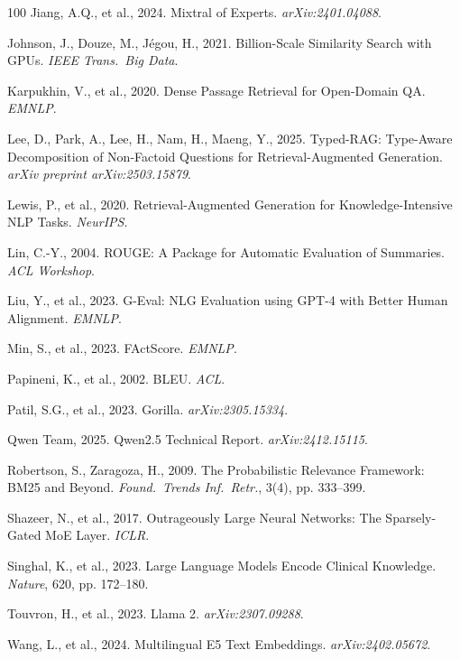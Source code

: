 \documentclass[a4paper,fleql]{cas-sc}
\begin{document}
\begin{thebibliography}{100}
Jiang, A.Q., et al., 2024. Mixtral of Experts. \textit{arXiv:2401.04088}.

Johnson, J., Douze, M., J\'{e}gou, H., 2021. Billion-Scale Similarity Search with GPUs. \textit{IEEE Trans.\ Big Data}.

Karpukhin, V., et al., 2020. Dense Passage Retrieval for Open-Domain QA. \textit{EMNLP}.

Lee, D., Park, A., Lee, H., Nam, H., Maeng, Y., 2025. Typed-RAG: Type-Aware
Decomposition of Non-Factoid Questions for Retrieval-Augmented Generation.
\textit{arXiv preprint arXiv:2503.15879}.

Lewis, P., et al., 2020. Retrieval-Augmented Generation for Knowledge-Intensive NLP Tasks. \textit{NeurIPS}.

Lin, C.-Y., 2004. ROUGE: A Package for Automatic Evaluation of Summaries. \textit{ACL Workshop}.

Liu, Y., et al., 2023. G-Eval: NLG Evaluation using GPT-4 with Better Human Alignment. \textit{EMNLP}.

Min, S., et al., 2023. FActScore. \textit{EMNLP}.

Papineni, K., et al., 2002. BLEU. \textit{ACL}.

Patil, S.G., et al., 2023. Gorilla. \textit{arXiv:2305.15334}.

Qwen Team, 2025. Qwen2.5 Technical Report. \textit{arXiv:2412.15115}.

Robertson, S., Zaragoza, H., 2009. The Probabilistic Relevance Framework: BM25 and Beyond. \textit{Found.\ Trends Inf.\ Retr.}, 3(4), pp. 333--399.

Shazeer, N., et al., 2017. Outrageously Large Neural Networks: The Sparsely-Gated MoE Layer. \textit{ICLR}.

Singhal, K., et al., 2023. Large Language Models Encode Clinical Knowledge. \textit{Nature}, 620, pp. 172--180.

Touvron, H., et al., 2023. Llama 2. \textit{arXiv:2307.09288}.

Wang, L., et al., 2024. Multilingual E5 Text Embeddings. \textit{arXiv:2402.05672}.


\end{thebibliography}
\end{document}
